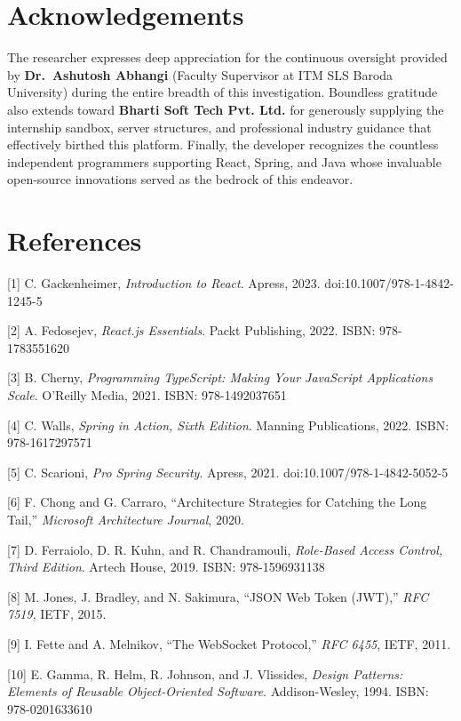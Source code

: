 \section{Acknowledgements}\label{acknowledgements}

The researcher expresses deep appreciation for the continuous oversight
provided by \textbf{Dr.~Ashutosh Abhangi} (Faculty Supervisor at ITM SLS
Baroda University) during the entire breadth of this investigation.
Boundless gratitude also extends toward \textbf{Bharti Soft Tech Pvt.
Ltd.} for generously supplying the internship sandbox, server
structures, and professional industry guidance that effectively birthed
this platform. Finally, the developer recognizes the countless
independent programmers supporting React, Spring, and Java whose
invaluable open-source innovations served as the bedrock of this
endeavor.

\section{References}\label{references}

{[}1{]} C. Gackenheimer, \emph{Introduction to React}. Apress, 2023.
doi:10.1007/978-1-4842-1245-5

{[}2{]} A. Fedosejev, \emph{React.js Essentials}. Packt Publishing,
2022. ISBN: 978-1783551620

{[}3{]} B. Cherny, \emph{Programming TypeScript: Making Your JavaScript
Applications Scale}. O'Reilly Media, 2021. ISBN: 978-1492037651

{[}4{]} C. Walls, \emph{Spring in Action, Sixth Edition}. Manning
Publications, 2022. ISBN: 978-1617297571

{[}5{]} C. Scarioni, \emph{Pro Spring Security}. Apress, 2021.
doi:10.1007/978-1-4842-5052-5

{[}6{]} F. Chong and G. Carraro, ``Architecture Strategies for Catching
the Long Tail,'' \emph{Microsoft Architecture Journal}, 2020.

{[}7{]} D. Ferraiolo, D. R. Kuhn, and R. Chandramouli, \emph{Role-Based
Access Control, Third Edition}. Artech House, 2019. ISBN: 978-1596931138

{[}8{]} M. Jones, J. Bradley, and N. Sakimura, ``JSON Web Token (JWT),''
\emph{RFC 7519}, IETF, 2015.

{[}9{]} I. Fette and A. Melnikov, ``The WebSocket Protocol,'' \emph{RFC
6455}, IETF, 2011.

{[}10{]} E. Gamma, R. Helm, R. Johnson, and J. Vlissides, \emph{Design
Patterns: Elements of Reusable Object-Oriented Software}.
Addison-Wesley, 1994. ISBN: 978-0201633610

